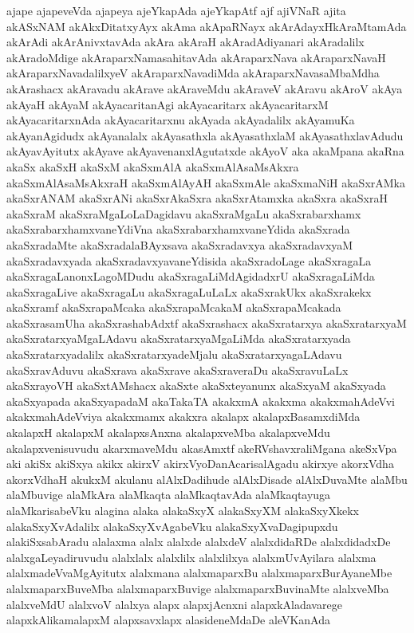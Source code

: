 {ajape
ajapeveVda
ajapeya
ajeYkapAda
ajeYkapAtf
ajf
ajiVNaR
ajita
akASxNAM
akAkxDitatxyAyx
akAma
akApaRNayx
akArAdayxHkAraMtamAda
akArAdi
akArAnivxtavAda
akAra
akAraH
akAradAdiyanari
akAradalilx
akAradoMdige
akAraparxNamasahitavAda
akAraparxNava
akAraparxNavaH
akAraparxNavadalilxyeV
akAraparxNavadiMda
akAraparxNavasaMbaMdha
akArashacx
akAravadu
akArave
akAraveMdu
akAraveV
akAravu
akAroV
akAya
akAyaH
akAyaM
akAyacaritanAgi
akAyacaritarx
akAyacaritarxM
akAyacaritarxnAda
akAyacaritarxnu
akAyada
akAyadalilx
akAyamuKa
akAyanAgidudx
akAyanalalx
akAyasathxla
akAyasathxlaM
akAyasathxlavAdudu
akAyavAyitutx
akAyave
akAyavenanxlAgutatxde
akAyoV
aka
akaMpana
akaRna
akaSx
akaSxH
akaSxM
akaSxmAlA
akaSxmAlAsaMsAkxra
akaSxmAlAsaMsAkxraH
akaSxmAlAyAH
akaSxmAle
akaSxmaNiH
akaSxrAMka
akaSxrANAM
akaSxrANi
akaSxrAkaSxra
akaSxrAtamxka
akaSxra
akaSxraH
akaSxraM
akaSxraMgaLoLaDagidavu
akaSxraMgaLu
akaSxrabarxhamx
akaSxrabarxhamxvaneYdiVna
akaSxrabarxhamxvaneYdida
akaSxrada
akaSxradaMte
akaSxradalaBAyxsava
akaSxradavxya
akaSxradavxyaM
akaSxradavxyada
akaSxradavxyavaneYdisida
akaSxradoLage
akaSxragaLa
akaSxragaLanonxLagoMDudu
akaSxragaLiMdAgidadxrU
akaSxragaLiMda
akaSxragaLive
akaSxragaLu
akaSxragaLuLaLx
akaSxrakUkx
akaSxrakekx
akaSxramf
akaSxrapaMcaka
akaSxrapaMcakaM
akaSxrapaMcakada
akaSxrasamUha
akaSxrashabAdxtf
akaSxrashacx
akaSxratarxya
akaSxratarxyaM
akaSxratarxyaMgaLAdavu
akaSxratarxyaMgaLiMda
akaSxratarxyada
akaSxratarxyadalilx
akaSxratarxyadeMjalu
akaSxratarxyagaLAdavu
akaSxravAduvu
akaSxrava
akaSxrave
akaSxraveraDu
akaSxravuLaLx
akaSxrayoVH
akaSxtAMshacx
akaSxte
akaSxteyanunx
akaSxyaM
akaSxyada
akaSxyapada
akaSxyapadaM
akaTakaTA
akakxmA
akakxma
akakxmahAdeVvi
akakxmahAdeVviya
akakxmamx
akakxra
akalapx
akalapxBasamxdiMda
akalapxH
akalapxM
akalapxsAnxna
akalapxveMba
akalapxveMdu
akalapxvenisuvudu
akarxmaveMdu
akasAmxtf
akeRVshavxraliMgana
akeSxVpa
aki
akiSx
akiSxya
akikx
akirxV
akirxVyoDanAcarisalAgadu
akirxye
akorxVdha
akorxVdhaH
akukxM
akulanu
alAlxDadihude
alAlxDisade
alAlxDuvaMte
alaMbu
alaMbuvige
alaMkAra
alaMkaqta
alaMkaqtavAda
alaMkaqtayuga
alaMkarisabeVku
alagina
alaka
alakaSxyX
alakaSxyXM
alakaSxyXkekx
alakaSxyXvAdalilx
alakaSxyXvAgabeVku
alakaSxyXvaDagipupxdu
alakiSxsabAradu
alalaxma
alalx
alalxde
alalxdeV
alalxdidaRDe
alalxdidadxDe
alalxgaLeyadiruvudu
alalxlalx
alalxlilx
alalxlilxya
alalxmUvAyilara
alalxma
alalxmadeVvaMgAyitutx
alalxmana
alalxmaparxBu
alalxmaparxBurAyaneMbe
alalxmaparxBuveMba
alalxmaparxBuvige
alalxmaparxBuvinaMte
alalxveMba
alalxveMdU
alalxvoV
alalxya
alapx
alapxjAcnxni
alapxkAladavarege
alapxkAlikamalapxM
alapxsavxlapx
alasideneMdaDe
aleVKanAda
}

